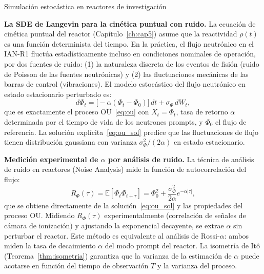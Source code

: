 \label{sec:estrella10}
\begin{estrella}{Simulación estocástica en reactores de investigación}

\textbf{La SDE de Langevin para la cinética puntual con ruido.}
La ecuación de cinética puntual del reactor (Capítulo~\ref{ch:cap5}) asume
que la reactividad $\rho(t)$ es una función determinista del tiempo. En la
práctica, el flujo neutrónico en el IAN-R1 fluctúa estadísticamente incluso
en condiciones nominales de operación, por dos fuentes de ruido: (1) la
naturaleza discreta de los eventos de fisión (ruido de Poisson de las fuentes
neutrónicas) y (2) las fluctuaciones mecánicas de las barras de control
(vibraciones). El modelo estocástico del flujo neutrónico en estado estacionario
perturbado es:
\[
  d\Phi_t = \bigl[-\alpha(\Phi_t - \Phi_0)\bigr]\,dt
  + \sigma_\Phi\,dW_t,
\]
que es exactamente el proceso OU~\eqref{eq:ou} con $X_t = \Phi_t$, tasa de
retorno $\alpha$ determinada por el tiempo de vida de los neutrones prompts, y
$\Phi_0$ el flujo de referencia. La solución explícita~\eqref{eq:ou_sol}
predice que las fluctuaciones de flujo tienen distribución gaussiana con
varianza $\sigma_\Phi^2/(2\alpha)$ en estado estacionario.

\textbf{Medición experimental de $\alpha$ por análisis de ruido.}
La técnica de análisis de ruido en reactores (Noise Analysis) mide la función
de autocorrelación del flujo:
\[
  R_\Phi(\tau) = \mathbb{E}[\Phi_t\Phi_{t+\tau}]
  = \Phi_0^2 + \frac{\sigma_\Phi^2}{2\alpha}e^{-\alpha|\tau|},
\]
que se obtiene directamente de la solución~\eqref{eq:ou_sol} y las propiedades
del proceso OU. Midiendo $R_\Phi(\tau)$ experimentalmente (correlación de
señales de cámara de ionización) y ajustando la exponencial decayente, se
extrae $\alpha$ sin perturbar el reactor. Este método es equivalente al
análisis de Rossi-$\alpha$: ambos miden la tasa de decaimiento $\alpha$ del
modo prompt del reactor. La isometría de Itô (Teorema~\ref{thm:isometria})
garantiza que la varianza de la estimación de $\alpha$ puede acotarse en
función del tiempo de observación $T$ y la varianza del proceso.


\end{estrella}
